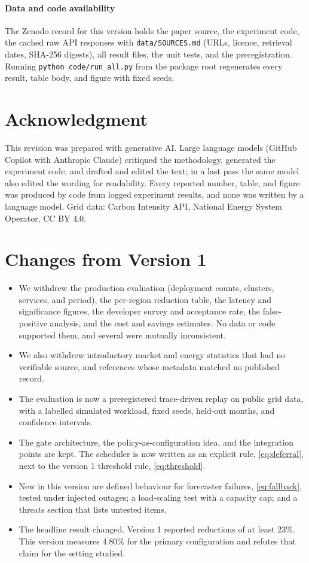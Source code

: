 \documentclass[journal]{IEEEtran}
\begin{document}
\paragraph*{Data and code availability} The Zenodo record for this version holds the paper source, the experiment code, the cached raw API responses with \texttt{data/SOURCES.md} (URLs, licence, retrieval dates, SHA-256 digests), all result files, the unit tests, and the preregistration. Running \texttt{python code/run\_all.py} from the package root regenerates every result, table body, and figure with fixed seeds.

\section*{Acknowledgment}
This revision was prepared with generative AI. Large language models (GitHub Copilot with Anthropic Claude) critiqued the methodology, generated the experiment code, and drafted and edited the text; in a last pass the same model also edited the wording for readability. Every reported number, table, and figure was produced by code from logged experiment results, and none was written by a language model. Grid data: Carbon Intensity API, National Energy System Operator, CC BY 4.0.

\appendices
\section{Changes from Version 1}
\label{app:changes}
\begin{itemize}
\item We withdrew the production evaluation (deployment counts, clusters, services, and period), the per-region reduction table, the latency and significance figures, the developer survey and acceptance rate, the false-positive analysis, and the cost and savings estimates. No data or code supported them, and several were mutually inconsistent.
\item We also withdrew introductory market and energy statistics that had no verifiable source, and references whose metadata matched no published record.
\item The evaluation is now a preregistered trace-driven replay on public grid data, with a labelled simulated workload, fixed seeds, held-out months, and confidence intervals.
\item The gate architecture, the policy-as-configuration idea, and the integration points are kept. The scheduler is now written as an explicit rule, \eqref{eq:deferral}, next to the version 1 threshold rule, \eqref{eq:threshold}.
\item New in this version are defined behaviour for forecaster failures, \eqref{eq:fallback}, tested under injected outages; a load-scaling test with a capacity cap; and a threats section that lists untested items.
\item The headline result changed. Version 1 reported reductions of at least 23\%. This version measures 4.80\% for the primary configuration and refutes that claim for the setting studied.
\end{itemize}



\end{document}
